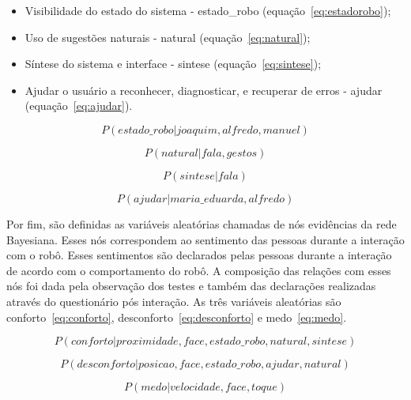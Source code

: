 \begin{itemize}
	\item Visibilidade do estado do sistema - estado\_robo (equação~\ref{eq:estadorobo});
	\item Uso de sugestões naturais - natural (equação~\ref{eq:natural});
	\item Síntese do sistema e interface - sintese (equação~\ref{eq:sintese});
	\item Ajudar o usuário a reconhecer, diagnosticar, e recuperar de erros - ajudar (equação~\ref{eq:ajudar}).
\end{itemize}

\begin{equation}
	\label{eq:estadorobo}
	P(estado\_robo | joaquim, alfredo, manuel)
\end{equation}

\begin{equation}
	\label{eq:natural}
	P(natural | fala, gestos)
\end{equation}

\begin{equation}
	\label{eq:sintese}
	P(sintese | fala)
\end{equation}

\begin{equation}
	\label{eq:ajudar}
	P(ajudar | maria\_eduarda, alfredo)
\end{equation}

Por fim, são definidas as variáveis aleatórias chamadas de nós evidências da rede Bayesiana. Esses nós correspondem ao sentimento das pessoas durante a interação com o robô. Esses sentimentos são declarados pelas pessoas durante a interação de acordo com o comportamento do robô. A composição das relações com esses nós foi dada pela observação dos testes e também das declarações realizadas através do questionário pós interação. As três variáveis aleatórias são conforto~\ref{eq:conforto}, desconforto~\ref{eq:desconforto} e medo~\ref{eq:medo}.

\begin{equation}
	\label{eq:conforto}
	P(conforto | proximidade, face, estado\_robo, natural, sintese)
\end{equation}

\begin{equation}
	\label{eq:desconforto}
	P(desconforto | posicao, face, estado\_robo, ajudar, natural)
\end{equation}

\begin{equation}
	\label{eq:medo}
	P(medo | velocidade, face, toque)
\end{equation}

